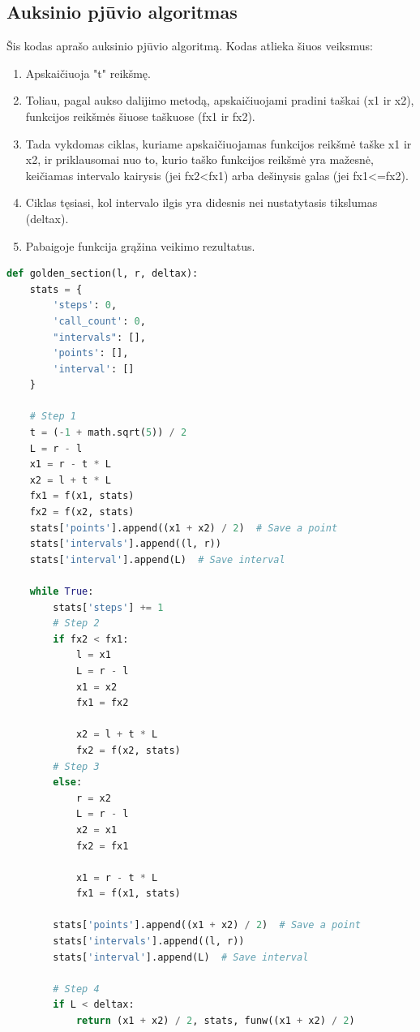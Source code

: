 \documentclass{VUMIFPSkursinis}
\begin{document}
\subsection{Auksinio pjūvio algoritmas}

Šis kodas aprašo auksinio pjūvio algoritmą. 
Kodas atlieka šiuos veiksmus:
\begin{enumerate}
  \item Apskaičiuoja "t" reikšmę.
  \item Toliau, pagal aukso dalijimo metodą, apskaičiuojami pradini taškai (x1 ir x2),
        funkcijos reikšmės šiuose taškuose (fx1 ir fx2).
  \item Tada vykdomas ciklas, kuriame apskaičiuojamas funkcijos reikšmė taške x1 ir x2,
        ir priklausomai nuo to, kurio taško funkcijos reikšmė yra mažesnė, keičiamas intervalo
        kairysis (jei fx2<fx1) arba dešinysis galas (jei fx1<=fx2).
  \item Ciklas tęsiasi, kol intervalo ilgis yra didesnis nei nustatytasis tikslumas (deltax).
  \item Pabaigoje funkcija grąžina veikimo rezultatus.
\end{enumerate}

\begin{lstlisting}[language=Python]
def golden_section(l, r, deltax):
    stats = {
        'steps': 0,
        'call_count': 0,
        "intervals": [],
        'points': [],
        'interval': []
    }

    # Step 1
    t = (-1 + math.sqrt(5)) / 2
    L = r - l
    x1 = r - t * L
    x2 = l + t * L
    fx1 = f(x1, stats)
    fx2 = f(x2, stats)
    stats['points'].append((x1 + x2) / 2)  # Save a point
    stats['intervals'].append((l, r))
    stats['interval'].append(L)  # Save interval

    while True:
        stats['steps'] += 1
        # Step 2
        if fx2 < fx1:
            l = x1
            L = r - l
            x1 = x2
            fx1 = fx2

            x2 = l + t * L
            fx2 = f(x2, stats)
        # Step 3
        else:
            r = x2
            L = r - l
            x2 = x1
            fx2 = fx1

            x1 = r - t * L
            fx1 = f(x1, stats)

        stats['points'].append((x1 + x2) / 2)  # Save a point
        stats['intervals'].append((l, r))
        stats['interval'].append(L)  # Save interval

        # Step 4
        if L < deltax:
            return (x1 + x2) / 2, stats, funw((x1 + x2) / 2)
\end{lstlisting}
\break 
\end{document}
